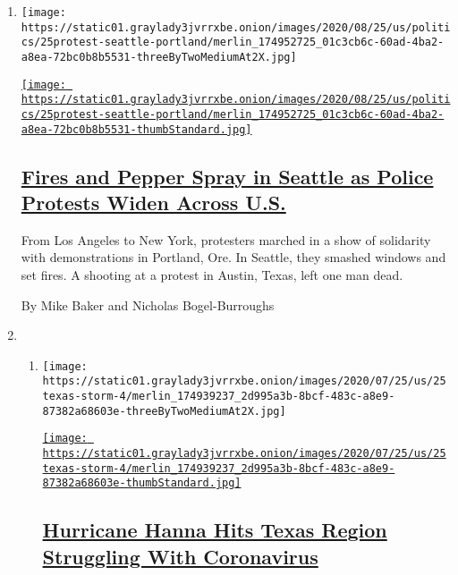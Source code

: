 \begin{enumerate}
\def\labelenumi{\arabic{enumi}.}
\item
  \texttt{[image: https://static01.graylady3jvrrxbe.onion/images/2020/08/25/us/politics/25protest-seattle-portland/merlin\_174952725\_01c3cb6c-60ad-4ba2-a8ea-72bc0b8b5531-threeByTwoMediumAt2X.jpg]}

  \href{/2020/07/25/us/protests-seattle-portland.html}{\texttt{[image: https://static01.graylady3jvrrxbe.onion/images/2020/08/25/us/politics/25protest-seattle-portland/merlin\_174952725\_01c3cb6c-60ad-4ba2-a8ea-72bc0b8b5531-thumbStandard.jpg]}}

  \hypertarget{fires-and-pepper-spray-in-seattle-as-police-protests-widen-across-us}{%
  \subsection{\texorpdfstring{\href{/2020/07/25/us/protests-seattle-portland.html}{Fires
  and Pepper Spray in Seattle as Police Protests Widen Across
  U.S.}}{Fires and Pepper Spray in Seattle as Police Protests Widen Across U.S.}}\label{fires-and-pepper-spray-in-seattle-as-police-protests-widen-across-us}}

  From Los Angeles to New York, protesters marched in a show of
  solidarity with demonstrations in Portland, Ore. In Seattle, they
  smashed windows and set fires. A shooting at a protest in Austin,
  Texas, left one man dead.

  By Mike Baker and Nicholas Bogel-Burroughs
\item
  \begin{enumerate}
  \def\labelenumii{\arabic{enumii}.}
  \item
    \texttt{[image: https://static01.graylady3jvrrxbe.onion/images/2020/07/25/us/25texas-storm-4/merlin\_174939237\_2d995a3b-8bcf-483c-a8e9-87382a68603e-threeByTwoMediumAt2X.jpg]}

    \href{/2020/07/25/us/hanna-storm-texas.html}{\texttt{[image: https://static01.graylady3jvrrxbe.onion/images/2020/07/25/us/25texas-storm-4/merlin\_174939237\_2d995a3b-8bcf-483c-a8e9-87382a68603e-thumbStandard.jpg]}}

    \hypertarget{hurricane-hanna-hits-texas-region-struggling-with-coronavirus}{%
    \subsection{\texorpdfstring{\href{/2020/07/25/us/hanna-storm-texas.html}{Hurricane
    Hanna Hits Texas Region Struggling With
    Coronavirus}}{Hurricane Hanna Hits Texas Region Struggling With Coronavirus}}\label{hurricane-hanna-hits-texas-region-struggling-with-coronavirus}}


\end{enumerate}
\end{enumerate}
